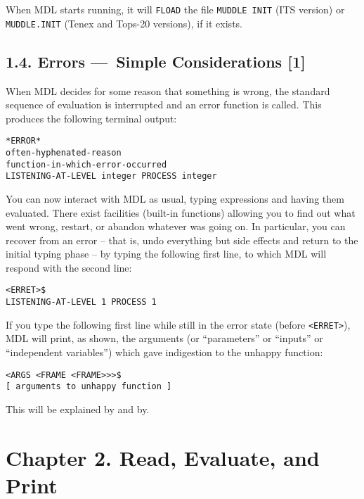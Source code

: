 \documentclass[a4paper,]{article}
\begin{document}
When MDL starts running, it will \texttt{FLOAD} the file \texttt{MUDDLE\ INIT} 
 (ITS  version) or \texttt{MUDDLE.INIT} (Tenex  and
Tops-20  versions), if it exists.

\subsection{1.4. Errors ---~Simple Considerations {[}1{]}}\label{errors-simple-considerations-1}

When MDL decides for some reason that something is wrong, the standard sequence of evaluation is interrupted and an error
function is called. This produces the following terminal output: 

\begin{verbatim}
*ERROR*
often-hyphenated-reason
function-in-which-error-occurred
LISTENING-AT-LEVEL integer PROCESS integer
\end{verbatim}

You can now interact with MDL as usual, typing expressions and having them evaluated. There exist facilities (built-in
functions) allowing you to find out what went wrong, restart, or abandon whatever was going on. In particular, you can
recover from an error -- that is, undo everything but side effects and return to the initial typing phase -- by typing the
following first line, to which MDL will respond with the second line: 

\begin{verbatim}
<ERRET>$
LISTENING-AT-LEVEL 1 PROCESS 1
\end{verbatim}

If you type the following first line while still in the error state (before \texttt{\textless{}ERRET\textgreater{}}), MDL
will print, as shown, the arguments (or ``parameters'' or ``inputs'' or ``independent variables'') which gave indigestion
to the unhappy function:

\begin{verbatim}
<ARGS <FRAME <FRAME>>>$
[ arguments to unhappy function ]
\end{verbatim}

This will be explained by and by.

\section{Chapter 2. Read, Evaluate, and Print}\label{chapter-2.-read-evaluate-and-print}
\end{document}
